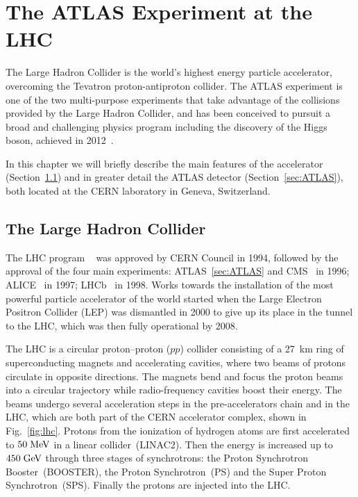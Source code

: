 \chapter{The ATLAS Experiment at the LHC}
\label{sec:experiment}

The Large Hadron Collider is the world's highest energy particle
accelerator, overcoming the Tevatron proton-antiproton collider. The
ATLAS experiment is one of the two multi-purpose experiments that take
advantage of the collisions provided by the Large Hadron Collider, and
has been conceived to pursuit a broad and challenging physics program
including the discovery of the Higgs boson, achieved in
2012~\cite{2012gk,Chatrchyan201230}.

In this chapter we will briefly describe the main features of 
the accelerator (Section~\ref{sec:LHC}) and in greater detail 
the ATLAS detector (Section~\ref{sec:ATLAS}), both located at the CERN
laboratory in Geneva, Switzerland.

\section{The Large Hadron Collider}
\label{sec:LHC}

The LHC program ~\cite{LHCreport} was approved by CERN Council in
1994, followed by the approval of the four main experiments:
ATLAS~\ref{sec:ATLAS} and CMS~\cite{cms} in 1996; ALICE~\cite{alice}
in 1997; LHCb~\cite{lhcb} in 1998. Works towards the installation of
the most powerful particle accelerator of the world started when the
Large Electron Positron Collider (LEP) was dismantled in 2000 to give
up its place in the tunnel to the LHC, which was then fully
operational by 2008.

The LHC is a circular proton--proton ($pp$) collider consisting of a
27~km ring of superconducting magnets and accelerating cavities, where
two beams of protons circulate in opposite directions. 
The magnets bend and focus the proton beams into a circular trajectory
while radio-frequency cavities boost their energy.
The beams undergo several acceleration steps in the pre-accelerators
chain and in the LHC, which are both part of the CERN accelerator
complex, shown in Fig.~\ref{fig:lhc}.
Protons from the ionization of hydrogen atoms are first accelerated to
\mbox{$50 \; \mathrm{MeV}$} in a linear collider~(LINAC2). Then the energy is
increased up to \mbox{$450 \; \mathrm{GeV}$} through three stages of
synchrotrons: the Proton Synchrotron Booster~(BOOSTER), the Proton
Synchrotron~(PS) and the Super Proton Synchrotron~(SPS).
Finally the protons are injected into the LHC.

